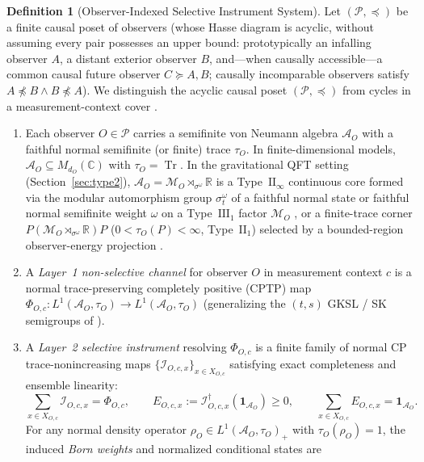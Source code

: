 \documentclass[11pt,a4paper]{article}
\theoremstyle{definition}
\newtheorem{definition}{Definition}
\theoremstyle{remark}
\newcommand{\Tr}{\operatorname{Tr}}
\newcommand{\cA}{\mathcal{A}}
\newcommand{\cI}{\mathcal{I}}
\newcommand{\cM}{\mathcal{M}}
\newcommand{\cP}{\mathcal{P}}
\newcommand{\bbC}{\mathbb{C}}
\newcommand{\bbR}{\mathbb{R}}
\newcommand{\1}{\mathbf{1}}
\begin{document}
\begin{definition}[Observer-Indexed Selective Instrument System]\label{def:arena}
Let $(\cP,\preceq)$ be a finite causal poset of observers (whose Hasse diagram is acyclic, without assuming every pair possesses an upper bound: prototypically an infalling observer $A$, a distant exterior observer $B$, and---when causally accessible---a common causal future observer $C\succeq A,B$; causally incomparable observers satisfy $A\not\preceq B \land B\not\preceq A$). We distinguish the acyclic causal poset $(\cP,\preceq)$ from cycles in a measurement-context cover \cite{AbramskyBrandenburger2011}.
\begin{enumerate}
  \item Each observer $O\in\cP$ carries a semifinite von Neumann algebra $\cA_O$ with a faithful normal semifinite (or finite) trace $\tau_O$. In finite-dimensional models, $\cA_O\subseteq M_{d_O}(\bbC)$ with $\tau_O=\Tr$. In the gravitational QFT setting (Section~\ref{sec:type2}), $\cA_O=\cM_O\rtimes_{\sigma^\omega}\bbR$ is a Type~$\mathrm{II}_\infty$ continuous core formed via the modular automorphism group $\sigma^\omega_t$ of a faithful normal state or faithful normal semifinite weight $\omega$ on a Type~$\mathrm{III}_1$ factor $\cM_O$ \cite{Takesaki1973,Witten2022}, or a finite-trace corner $P(\cM_O\rtimes_{\sigma^\omega}\bbR)P$ ($0<\tau_O(P)<\infty$, Type~$\mathrm{II}_1$) selected by a bounded-region observer-energy projection \cite{CLPW2023,JensenSorceSperanza2023}.
  \item A \emph{Layer~1 non-selective channel} for observer $O$ in measurement context $c$ is a normal trace-preserving completely positive (CPTP) map $\Phi_{O,c}:L^1(\cA_O,\tau_O)\to L^1(\cA_O,\tau_O)$ (generalizing the $(t,s)$ GKSL / SK semigroups of \cite{Soga2026OSTQD,Soga2026OSTQDSK}).
  \item A \emph{Layer~2 selective instrument} \cite{DaviesLewis1970,Ozawa1984} resolving $\Phi_{O,c}$ is a finite family of normal CP trace-nonincreasing maps $\{\cI_{O,c,x}\}_{x\in X_{O,c}}$ satisfying exact completeness and ensemble linearity:
  \begin{equation}\label{eq:layer2-instrument}
    \sum_{x\in X_{O,c}} \cI_{O,c,x} = \Phi_{O,c},
    \qquad
    E_{O,c,x} := \cI_{O,c,x}^\dagger(\1_{\cA_O}) \ge 0,
    \qquad
    \sum_{x\in X_{O,c}} E_{O,c,x} = \1_{\cA_O}.
  \end{equation}
  For any normal density operator $\rho_O\in L^1(\cA_O,\tau_O)_+$ with $\tau_O(\rho_O)=1$, the induced \emph{Born weights} and normalized conditional states are

\end{enumerate}
\end{definition}
\end{document}
